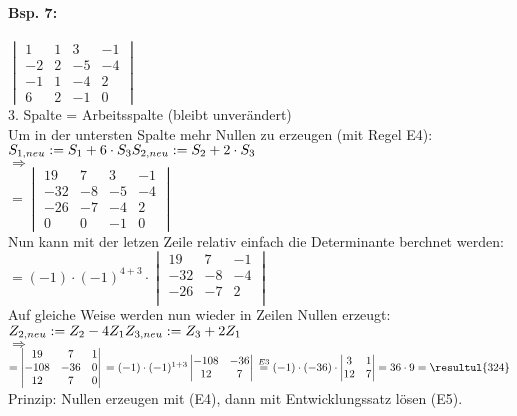 \paragraph{Bsp. 7:} \parskp
$\begin{vmatrix}
1 & 1 & 3 & -1\\
-2 & 2& -5& -4\\
-1 & 1 & -4 & 2\\
6 & 2 &-1 & 0
\end{vmatrix}$\\
3. Spalte = Arbeitsspalte (bleibt unverändert)\\
Um in der untersten Spalte mehr Nullen zu erzeugen (mit Regel E4):\\
$S_{1,neu}:=S_1+6\cdot S_3\\
S_{2,neu}:=S_2+2\cdot S_3$\\
$\Rightarrow$\\
$=\begin{vmatrix}
19 & 7 & 3 & -1\\
-32 & -8& -5& -4\\
-26 & -7 & -4 & 2\\
0 & 0 &-1 & 0
\end{vmatrix}$\\
Nun kann mit der letzen Zeile relativ einfach die Determinante berchnet werden:\\
$=(-1)\cdot (-1)^{4+3}\cdot \begin{vmatrix}
19 & 7 &-1\\
-32 & -8 & -4\\
-26 & -7 & 2\\
\end{vmatrix}$\\
Auf gleiche Weise werden nun wieder in Zeilen Nullen erzeugt:\\
$Z_{2,neu}:=Z_2-4Z_1\\
Z_{3,neu}:=Z_3+2Z_1$\\
$\Rightarrow$\\
$=\begin{vmatrix}
19 & 7 & 1\\
-108 & -36 & 0\\
12 & 7 &0
\end{vmatrix}\\
=(-1)\cdot (-1)^{1+3}\begin{vmatrix}
-108 & -36\\
12 & 7
\end{vmatrix}\\
\overset{E3}{=}(-1)\cdot (-36) \cdot \begin{vmatrix}
3 & 1 \\
12 & 7
\end{vmatrix}=36 \cdot 9 = \resultul{324}$\\
Prinzip: Nullen erzeugen mit (E4), dann mit Entwicklungssatz lösen (E5).
